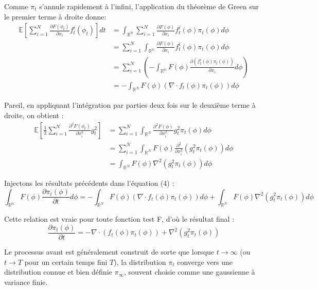 \documentclass{article}
\theoremstyle{definition} %
\theoremstyle{definition} %
\theoremstyle{definition} %
\theoremstyle{definition} %
\begin{document}
Comme $\pi_t$ s'annule rapidement à l'infini, l’application du théorème de Green sur le premier terme à droite donne:
\begin{align*}
    \mathbb{E}[\sum_{i=1}^N \frac{\partial F(\phi_t)}{\partial x_i} f^i_t(\phi_t)] dt &= \int_{\mathbb{R^N}}\sum_{i=1}^N \frac{\partial F(\phi)}{\partial x_i} f^i_t(\phi) \pi_t(\phi)d\phi\\
    &=\sum_{i=1}^N \int_{\mathbb{R^N}} \frac{\partial F(\phi)}{\partial x_i} f^i_t(\phi) \pi_t(\phi)d\phi \\
    &= \sum_{i=1}^N(- \int_{\mathbb{R^N}} F(\phi)\frac{\partial (f^i_t(\phi) \pi_t(\phi))}{\partial x_i} d\phi)\\
    &= - \int_{\mathbb{R}^N}F(\phi) (\nabla \cdot f_t(\phi)\pi_t(\phi))d\phi
\end{align*}

Pareil, en appliquant l'intégration par parties deux fois sur le deuxième terme à droite, on obtient :
\begin{align*}
    \mathbb{E}[\frac{1}{2} \sum_{i=1}^N\frac{\partial^2 F(\phi_t)}{\partial x_i^2} g_t^2] &= \sum_{i=1}^N \int_{\mathbb{R}^N } \frac{\partial^2 F(\phi)}{\partial x_i^2} g_t^2 \pi_t(\phi)d\phi\\
    &=\sum_{i=1}^N \int_{\mathbb{R}^N } F(\phi) \frac{\partial^2}{\partial x_i^2} (g_t^2 \pi_t(\phi)) d\phi \\
    &= \int_{\mathbb{R}^N } F(\phi) \nabla^2(g_t^2 \pi_t(\phi)) d\phi
\end{align*}

Injectons les résultats précédents dans l'équation (4) :
\[\int_{\mathbb{R^N}}F(\phi)\frac{\partial\pi_t(\phi)}{\partial t} d\phi = - \int_{\mathbb{R}^N}F(\phi) (\nabla \cdot f_t(\phi)\pi_t(\phi))d\phi + \int_{\mathbb{R}^N } F(\phi) \nabla^2(g_t^2 \pi_t(\phi)) d\phi\]

Cette relation est vraie pour toute fonction test F, d'où le résultat final : 
\[\frac{\partial\pi_t(\phi)}{\partial t} = -\nabla \cdot (f_t(\phi)\pi_t(\phi)) + \nabla^2(g_t^2 \pi_t(\phi)) \] 

Le processus avant est généralement construit de sorte que lorsque $t \rightarrow \infty$ (ou $t \rightarrow T$ pour un certain temps fini $T$), la distribution $\pi_t$ converge vers une distribution connue et bien définie $\pi_{\infty}$, souvent choisie comme une gaussienne à variance finie.
\end{document}
